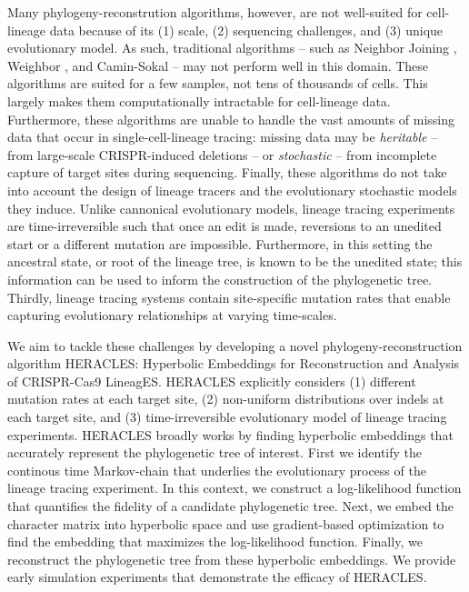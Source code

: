 \documentclass{article}
\begin{document}
Many phylogeny-reconstrution algorithms, however, are not well-suited for cell-lineage data because of its (1) scale, (2) sequencing challenges, and (3) unique evolutionary model. As such, traditional algorithms -- such as Neighbor Joining \cite{saitou1987neighbor}, Weighbor \cite{bruno2000}, and Camin-Sokal \cite{camin1965method} -- may not perform well in this domain. These algorithms are suited for a few samples, not tens of thousands of cells. This largely makes them computationally intractable for cell-lineage data. Furthermore, these algorithms are unable to handle the vast amounts of missing data that occur in single-cell-lineage tracing: missing data may be \emph{heritable} -- from large-scale CRISPR-induced deletions -- or \emph{stochastic} -- from incomplete capture of target sites during sequencing. Finally, these algorithms do not take into account the design of lineage tracers and the evolutionary stochastic models they induce. Unlike cannonical evolutionary models, lineage tracing experiments are time-irreversible such that once an edit is made, reversions to an unedited start or a different mutation are impossible.  Furthermore, in this setting the ancestral state, or root of the lineage tree, is known to be the unedited state; this information can be used to inform the construction of the phylogenetic tree. Thirdly, lineage tracing systems contain site-specific mutation rates that enable capturing evolutionary relationships at varying time-scales.

We aim to tackle these challenges by developing a novel phylogeny-reconstruction algorithm HERACLES: Hyperbolic Embeddings for Reconstruction and Analysis of CRISPR-Cas9 LineagES. HERACLES explicitly considers (1) different mutation rates at each target site, (2) non-uniform distributions over indels at each target site, and (3) time-irreversible evolutionary model of lineage tracing experiments. HERACLES broadly works by finding hyperbolic embeddings that accurately represent the phylogenetic tree of interest. First we identify the continous time Markov-chain that underlies the evolutionary process of the lineage tracing experiment. In this context, we construct a log-likelihood function that quantifies the fidelity of a candidate phylogenetic tree. Next, we embed the character matrix into hyperbolic space and use gradient-based optimization to find the embedding that maximizes the log-likelihood function. Finally, we reconstruct the phylogenetic tree from these hyperbolic embeddings. We provide early simulation experiments that demonstrate the efficacy of HERACLES.
\end{document}
